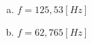 %
%
    \begin{enumerate}[a)]
        \item \(f=125,53[Hz]\)
        \item \(f=62,765[Hz]\)
    \end{enumerate}
